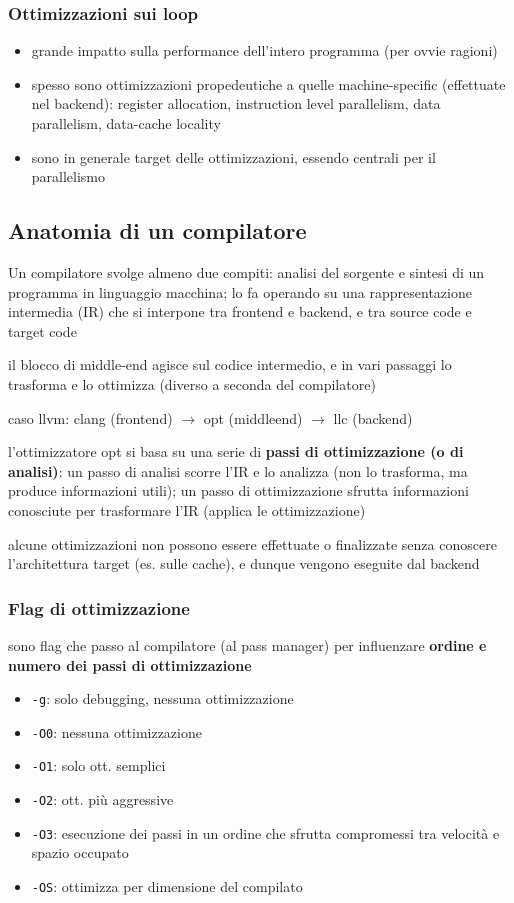 \subsubsection{Ottimizzazioni sui loop}

\begin{itemize}
  \item grande impatto sulla performance dell'intero programma (per ovvie ragioni)
  \item spesso sono ottimizzazioni propedeutiche a quelle machine-specific (effettuate nel backend): register allocation, instruction level parallelism, data parallelism, data-cache locality
  \item sono in generale target delle ottimizzazioni, essendo centrali per il parallelismo
\end{itemize}

\subsection{Anatomia di un compilatore}

Un compilatore svolge almeno due compiti: analisi del sorgente e sintesi di un programma in linguaggio macchina; lo fa operando su una rappresentazione intermedia (IR) che si interpone tra frontend e backend, e tra source code e target code

il blocco di middle-end agisce sul codice intermedio, e in vari passaggi lo trasforma  e lo ottimizza (diverso a seconda del compilatore)

caso llvm: clang (frontend) $\rightarrow$ opt (middleend) $\rightarrow$ llc (backend)

l'ottimizzatore opt si basa su una serie di \textbf{passi di ottimizzazione (o di analisi)}: un passo di analisi scorre l'IR e lo analizza (non lo trasforma, ma produce informazioni utili); un passo di ottimizzazione sfrutta informazioni conosciute per trasformare l'IR (applica le ottimizzazione)


alcune ottimizzazioni non possono essere effettuate o finalizzate senza conoscere l'architettura target (es. sulle cache), e dunque vengono eseguite dal backend

\subsubsection{Flag di ottimizzazione}

sono flag che passo al compilatore (al pass manager) per influenzare \textbf{ordine e numero dei passi di ottimizzazione}
\begin{itemize}
  \item \lstinline|-g|: solo debugging, nessuna ottimizzazione
  \item \lstinline|-O0|: nessuna ottimizzazione
  \item \lstinline|-O1|: solo ott. semplici
  \item \lstinline|-O2|: ott. pi\`u aggressive
  \item \lstinline|-O3|: esecuzione dei passi in un ordine che sfrutta compromessi tra velocit\`a e spazio occupato
  \item \lstinline|-OS|: ottimizza per dimensione del compilato
\end{itemize}

